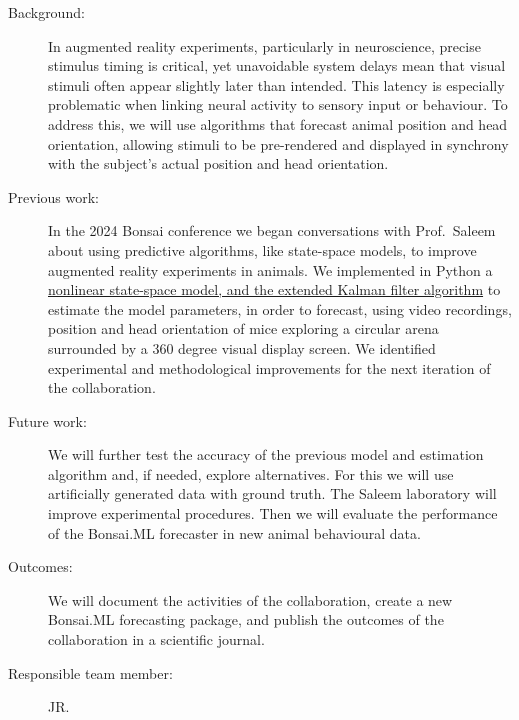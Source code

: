 \begin{description}

    \item[Background:] In augmented reality experiments, particularly in
        neuroscience, precise stimulus timing is critical, yet unavoidable
        system delays mean that visual stimuli often appear slightly later than
        intended. This latency is especially problematic when linking neural
        activity to sensory input or behaviour. To address this, we will use
        algorithms that forecast animal position and head orientation, allowing
        stimuli to be pre-rendered and displayed in synchrony with the
        subject's actual position and head orientation.

    \item[Previous work:] In the 2024 Bonsai conference we began conversations
        with Prof.~Saleem about using predictive algorithms, like state-space
        models, to improve augmented reality experiments in animals. We
        implemented in Python a
        \href{https://github.com/joacorapela/collaborationAman/blob/master/reports/ekfForKinematicsAndHeadOrientation/ekfForKinematicsAndHeadOrientation.pdf}{
            nonlinear state-space model, and the extended Kalman filter
            algorithm} to estimate the model parameters, in order to forecast,
        using video recordings, position and head orientation of mice exploring
        a circular arena surrounded by a 360 degree visual display screen. We identified
        experimental and methodological improvements for the next iteration of
        the collaboration.

    \item[Future work:] We will further test the accuracy of the previous model
        and estimation algorithm and, if needed, explore alternatives. For this
        we will use artificially generated data with ground truth. The Saleem
        laboratory will improve experimental procedures. Then we will evaluate
        the performance of the Bonsai.ML forecaster in new animal behavioural
        data.

    \item[Outcomes:] We will document the activities of the collaboration, create a new
        Bonsai.ML forecasting package, and publish the outcomes of the
        collaboration in a scientific journal.

    \item[Responsible team member:] JR.

\end{description}

